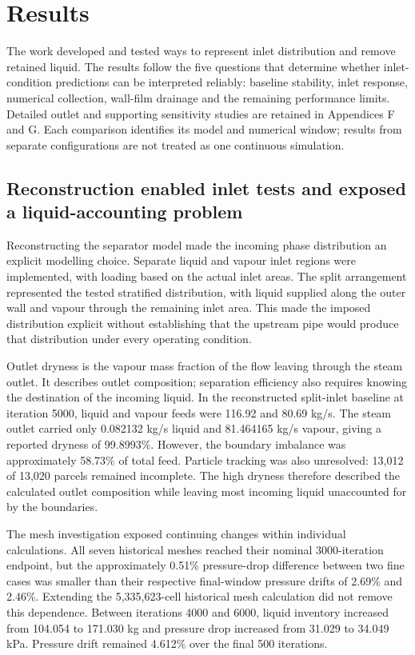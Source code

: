 \section{Results}

The work developed and tested ways to represent inlet distribution and remove retained liquid. The results follow the five questions that determine whether inlet-condition predictions can be interpreted reliably: baseline stability, inlet response, numerical collection, wall-film drainage and the remaining performance limits. Detailed outlet and supporting sensitivity studies are retained in Appendices F and G. Each comparison identifies its model and numerical window; results from separate configurations are not treated as one continuous simulation.

\subsection{Reconstruction enabled inlet tests and exposed a liquid-accounting problem}

Reconstructing the separator model made the incoming phase distribution an explicit modelling choice. Separate liquid and vapour inlet regions were implemented, with loading based on the actual inlet areas. The split arrangement represented the tested stratified distribution, with liquid supplied along the outer wall and vapour through the remaining inlet area. This made the imposed distribution explicit without establishing that the upstream pipe would produce that distribution under every operating condition.

Outlet dryness is the vapour mass fraction of the flow leaving through the steam outlet. It describes outlet composition; separation efficiency also requires knowing the destination of the incoming liquid. In the reconstructed split-inlet baseline at iteration 5000, liquid and vapour feeds were 116.92 and 80.69 kg/s. The steam outlet carried only 0.082132 kg/s liquid and 81.464165 kg/s vapour, giving a reported dryness of 99.8993\%. However, the boundary imbalance was approximately 58.73\% of total feed. Particle tracking was also unresolved: 13,012 of 13,020 parcels remained incomplete. The high dryness therefore described the calculated outlet composition while leaving most incoming liquid unaccounted for by the boundaries.

The mesh investigation exposed continuing changes within individual calculations. All seven historical meshes reached their nominal 3000-iteration endpoint, but the approximately 0.51\% pressure-drop difference between two fine cases was smaller than their respective final-window pressure drifts of 2.69\% and 2.46\%. Extending the 5,335,623-cell historical mesh calculation did not remove this dependence. Between iterations 4000 and 6000, liquid inventory increased from 104.054 to 171.030 kg and pressure drop increased from 31.029 to 34.049 kPa. Pressure drift remained 4.612\% over the final 500 iterations.

